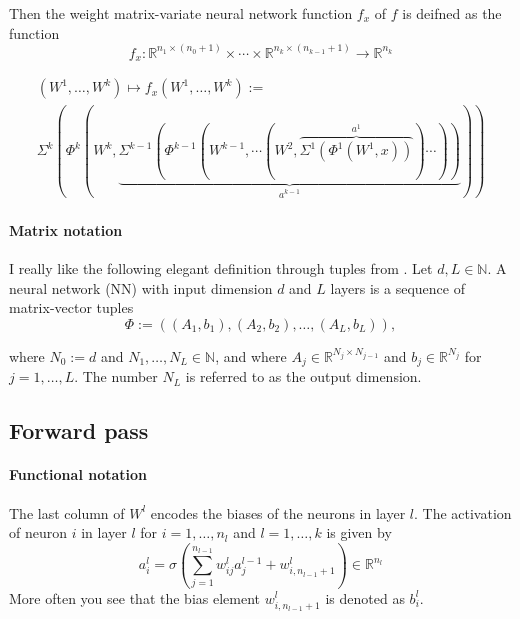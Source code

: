 \documentclass[draft]{article}
\def\RealSet{\mathbb{R}}
\begin{document}
Then the weight matrix-variate neural network function $f_x$ of $f$ is deifned as the function
\[
f_x \colon \RealSet^{n_1 \times (n_0 + 1)} \times \cdots \times \RealSet^{n_k \times (n_{k-1} + 1)} \rightarrow \RealSet^{n_k}
\]

\begin{multline}\label{f_x}
(W^1,\dots,W^k)\mapsto f_x(W^1,\dots,W^k) := \\
\Sigma^k( \Phi^k( W^k, \underbrace{\Sigma^{k-1}( \Phi^{k-1}( W^{k-1}, \cdots (W^2, \overbrace{\Sigma^1( \Phi^1(W^1, x))}^{a^1}) \cdots) ) }_{a^{k-1}} ))
\end{multline}

\paragraph{Matrix notation}
I really like the following elegant definition through tuples from \cite{Karner:2022}. Let $d, L \in \mathbb{N}$. A neural network (NN) with input dimension $d$ and $L$ layers is
a sequence of matrix-vector tuples
\[
\Phi := ((A_1, b_1), (A_2, b_2), \ldots , (A_L, b_L)),
\]

where $N_0 := d$ and $N_1, \ldots , N_L \in \mathbb{N}$, and where $A_j \in \RealSet^{N_{j}\times N_{j-1}}$ and $b_j \in \RealSet^{N_j}$ for $j = 1, \ldots, L$. The number $N_L$ is referred to as the output dimension.


\subsection{Forward pass}

\paragraph{Functional notation}
The last column of $W^l$ encodes the biases of the neurons in layer $l$. The activation of neuron $i$ in layer $l$ for $i = 1,\dots,n_l$ and $l = 1,\dots,k$ is given by
\begin{equation}\label{forward_f}
a^l_i = \sigma \left( \sum_{j=1}^{n_{l-1}} w_{ij}^l a_j^{l-1} + w_{i,n_{l-1}+1}^l \right) \in \RealSet^{n_l}
\end{equation}
More often you see that the bias element $w^l_{i,n_{l-1}+1}$ is denoted as $b_i^l$.
\end{document}
